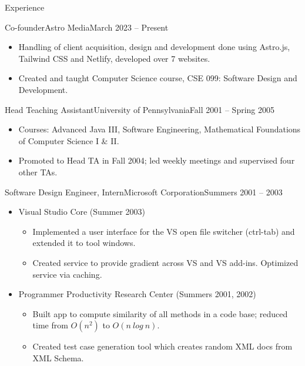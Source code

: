 \documentclass[]{mcdowellcv}
\begin{document}
    \begin{cvsection}{Experience}
        
        \begin{cvsubsection}{Co-founder}{Astro Media}{March 2023 -- Present}    
            \begin{itemize}
                \item Handling of client acquisition, design and development done using Astro.js, Tailwind CSS and Netlify, developed over 7 websites.
                \item Created and taught Computer Science course, CSE 099: Software Design and Development.
            \end{itemize}
        \end{cvsubsection}
        
        \begin{cvsubsection}{Head Teaching Assistant}{University of Pennsylvania}{Fall 2001 -- Spring 2005}        
            \begin{itemize}
                \item Courses: Advanced Java III, Software Engineering, Mathematical Foundations of Computer Science I \& II.
                \item Promoted to Head TA in Fall 2004; led weekly meetings and supervised four other TAs.
            \end{itemize}
        \end{cvsubsection}
        
        \begin{cvsubsection}{Software Design Engineer, Intern}{Microsoft Corporation}{Summers 2001 -- 2003}
            \begin{itemize}
                \item Visual Studio Core (Summer 2003)        
                \begin{itemize}
                    \item Implemented a user interface for the VS open file switcher (ctrl-tab) and extended it to tool windows.
                    \item Created service to provide gradient across VS and VS add-ins. Optimized service via caching.
                \end{itemize}
                \item Programmer Productivity Research Center (Summers 2001, 2002)
                \begin{itemize}
                    \item Built app to compute similarity of all methods in a code base; reduced time from $O(n^2)$ to $O(n\ log\ n)$. 
                    \item Created test case generation tool which creates random XML docs from XML Schema.
                \end{itemize}
            \end{itemize}
        \end{cvsubsection}
    \end{cvsection}
    
\end{document}
